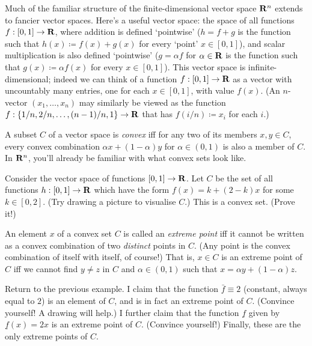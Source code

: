 \documentclass[11pt,letterpaper,reqno,oneside]{book}
\begin{document}
\begin{appendices}
Much of the familiar structure of the finite-dimensional vector space $\mathbf{R}^n$ extends to fancier vector spaces.
Here's a useful vector space: the space of all functions $f : [0,1] \to \mathbf{R}$,
where addition is defined `pointwise' ($h = f+g$ is the function such that $h(x) \coloneqq f(x) + g(x)$ for every `point' $x \in [0,1]$),
and scalar multiplication is also defined `pointwise' ($g = \alpha f$ for $\alpha \in \mathbf{R}$ is the function such that $g(x) \coloneqq \alpha f(x)$ for every $x \in [0,1]$).
This vector space is infinite-dimensional;
indeed we can think of a function $f : [0,1] \to \mathbf{R}$ as a vector with uncountably many entries, one for each $x \in [0,1]$, with value $f(x)$.
(An $n$-vector $(x_1,\dots,x_n)$ may similarly be viewed as the function $f : \{1/n,2/n,\dots,(n-1)/n,1\} \to \mathbf{R}$ that has $f(i/n) \coloneqq x_i$ for each $i$.)

A subset $C$ of a vector space is \emph{convex} iff
for any two of its members $x,y \in C$,
every convex combination $\alpha x + (1-\alpha) y$ for $\alpha \in (0,1)$
is also a member of $C$.
In $\mathbf{R}^n$, you'll already be familiar with what convex sets look like.

\setcounter{example}{1}
\begin{example}
	\label{example:fg}
	Consider the vector space of functions $[0,1] \to \mathbf{R}$.
	Let $C$ be the set of all functions $h : [0,1] \to \mathbf{R}$ which have the form
	$f(x) = k + (2-k) x$
	for some $k \in [0,2]$.
	(Try drawing a picture to visualise $C$.)
	This is a convex set. (Prove it!)
\end{example}

An element $x$ of a convex set $C$ is called an \emph{extreme point}
iff it cannot be written as a convex combination of two \emph{distinct} points in $C$. (Any point is the convex combination of itself with itself, of course!)
That is, $x \in C$ is an extreme point of $C$ iff
we cannot find $y \neq z$ in $C$ and $\alpha \in (0,1)$
such that $x = \alpha y + (1-\alpha) z$.

\setcounter{example}{1}
\begin{example}[continued]
	\label{example:fg2}
	Return to the previous example.
	I claim that the function $\bar{f} \equiv 2$ (constant, always equal to $2$) is an element of $C$,
	and is in fact an extreme point of $C$. (Convince yourself! A drawing will help.)
	I further claim that the function $\underline{f}$ given by $\underline{f}(x) = 2x$ is an extreme point of $C$. (Convince yourself!)
	Finally, these are the only extreme points of $C$.
\end{example}


\end{appendices}
\end{document}
